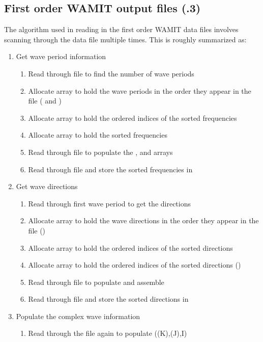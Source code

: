 \subsection{First order WAMIT output files (.3)}
The algorithm used in reading in the first order WAMIT data files involves scanning through the data file multiple times.  This is roughly summarized as:
\begin{enumerate}
   \item{Get wave period information}
   \begin{enumerate}
      \item{Read through file to find the number of wave periods}
      \item{Allocate array to hold the wave periods in the order they appear in the file ( and )}
      \item{Allocate array  to hold the ordered indices of the sorted frequencies}
      \item{Allocate array  to hold the sorted frequencies}
      \item{Read through file to populate the ,  and  arrays}
      \item{Read through file and store the sorted frequencies in }
   \end{enumerate}
   \item{Get wave directions}
   \begin{enumerate}
      \item{Read through first wave period to get the directions}
      \item{Allocate array to hold the wave directions in the order they appear in the file ()}
      \item{Allocate array  to hold the ordered indices of the sorted directions}
      \item{Allocate array to hold the ordered indices of the sorted directions ()}
      \item{Read through file to populate  and assemble}
      \item{Read through file and store the sorted directions in }
   \end{enumerate}
   \item{Populate the complex wave information }
   \begin{enumerate}
      \item{Read through the file again to populate ((K),(J),I)}
   \end{enumerate}
\end{enumerate}

